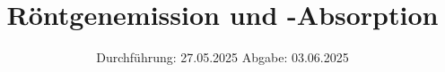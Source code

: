 

\subject{v602}
\title{Röntgenemission und -Absorption}
\date{%
  Durchführung: 27.05.2025
  \hspace{3em}
  Abgabe: 03.06.2025
}



\maketitle
\thispagestyle{empty}
\tableofcontents
\newpage






\printbibliography{}


